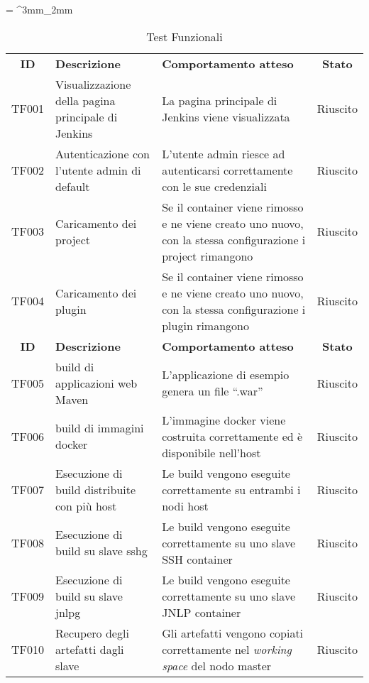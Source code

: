 \tabulinesep = ^3mm_2mm
\begin{longtabu} to \textwidth {cXXc}
    \caption[Test Funzionali]{Test Funzionali}
    \label{tab:test}
    \endlastfoot
    \rowfont{\bfseries\sffamily\leavevmode\color{white}}
    \textbf{ID} & \textbf{Descrizione} & \textbf{Comportamento atteso} & \textbf{Stato}\\
    TF001 & Visualizzazione della pagina principale di Jenkins & La pagina principale di Jenkins viene visualizzata & Riuscito\\ %
    TF002 & Autenticazione con l'utente admin di default & L'utente admin riesce ad autenticarsi correttamente con le sue credenziali & Riuscito\\ %
    TF003 & Caricamento dei \gls{project} & Se il container viene rimosso e ne viene creato uno nuovo, con la stessa configurazione i project rimangono & Riuscito\\ %
    TF004 & Caricamento dei \gls{plugin} & Se il container viene rimosso e ne viene creato uno nuovo, con la stessa configurazione i plugin rimangono & Riuscito\\ %
    \newpage
    \rowfont{\bfseries\sffamily\leavevmode\color{white}}
    \textbf{ID} & \textbf{Descrizione} & \textbf{Comportamento atteso} & \textbf{Stato}\\
    TF005 & \gls{build} di applicazioni web Maven & L'applicazione di esempio genera un file ``.\gls{war}'' & Riuscito\\ %
    TF006 & \gls{build} di immagini docker & L'immagine docker viene costruita correttamente ed è disponibile nell'\gls{host} & Riuscito\\ %
    TF007 & Esecuzione di \gls{build} distribuite con più \gls{host} & Le \gls{build} vengono eseguite correttamente su entrambi i nodi \gls{host} & Riuscito\\ %
    TF008 & Esecuzione di \gls{build} su \gls{slave} \gls{sshg} & Le \gls{build} vengono eseguite correttamente su uno \gls{slave} SSH \gls{container} & Riuscito\\ %
    TF009 & Esecuzione di \gls{build} su \gls{slave} \gls{jnlpg} & Le \gls{build} vengono eseguite correttamente su uno \gls{slave} JNLP \gls{container} & Riuscito\\ %
    TF010 & Recupero degli artefatti dagli \gls{slave} & Gli artefatti vengono copiati correttamente nel \textit{working space} del nodo \gls{master} & Riuscito\\ %

\end{longtabu}
